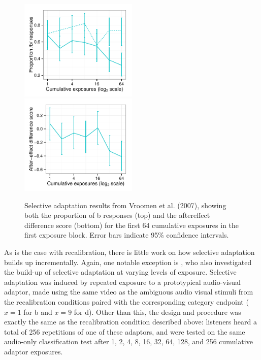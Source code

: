 \begin{figure}[htb]
  \centering
  \includegraphics[width=0.5\textwidth]{vroomen-bd-selad-first-64.pdf}
  \includegraphics[width=0.5\textwidth]{vroomen-ae-selad-first-64.pdf}
  \caption{Selective adaptation results from Vroomen et al. (2007), showing both the proportion of \ph b responses (top) and the aftereffect difference score (bottom) for the first 64 cumulative exposures in the first exposure block. Error bars indicate 95\% confidence intervals.}
  \label{fig:vroomen-results-64-selad}
\end{figure}

As is the case with recalibration, there is little work on how selective adaptation builds up incrementally.  Again, one notable exception is , who also investigated the build-up of selective adaptation at varying levels of exposure.  Selective adaptation was induced by repeated exposure to a prototypical audio-visual adaptor, made using the same video as the ambiguous audio visual stimuli from the recalibration conditions paired with the corresponding category endpoint ($x=1$ for \ph b and $x=9$ for \ph d).  Other than this, the design and procedure was exactly the same as the recalibration condition described above: listeners heard a total of 256 repetitions of one of these adaptors, and were tested on the same audio-only classification test after 1, 2, 4, 8, 16, 32, 64, 128, and 256 cumulative adaptor exposures.

